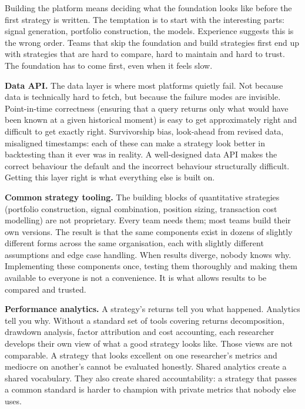 \documentclass[
  11pt,
]{article}
\begin{document}
Building the platform means deciding what the foundation looks like
before the first strategy is written. The temptation is to start with
the interesting parts: signal generation, portfolio construction, the
models. Experience suggests this is the wrong order. Teams that skip the
foundation and build strategies first end up with strategies that are
hard to compare, hard to maintain and hard to trust. The foundation has
to come first, even when it feels slow.

\textbf{Data API.} The data layer is where most platforms quietly fail.
Not because data is technically hard to fetch, but because the failure
modes are invisible. Point-in-time correctness (ensuring that a query
returns only what would have been known at a given historical moment)
is easy to get approximately right and difficult to get exactly right.
Survivorship bias, look-ahead from revised data, misaligned timestamps:
each of these can make a strategy look better in backtesting than it
ever was in reality. A well-designed data API makes the correct
behaviour the default and the incorrect behaviour structurally
difficult. Getting this layer right is what everything else is built on.

\textbf{Common strategy tooling.} The building blocks of quantitative
strategies (portfolio construction, signal combination, position
sizing, transaction cost modelling) are not proprietary. Every team
needs them; most teams build their own versions. The result is that the
same components exist in dozens of slightly different forms across the
same organisation, each with slightly different assumptions and edge
case handling. When results diverge, nobody knows why. Implementing
these components once, testing them thoroughly and making them available
to everyone is not a convenience. It is what allows results to be
compared and trusted.

\textbf{Performance analytics.} A strategy's returns tell you what
happened. Analytics tell you why. Without a standard set of tools
covering returns decomposition, drawdown analysis, factor attribution
and cost accounting, each researcher develops their own view of what a
good strategy looks like. Those views are not comparable. A strategy
that looks excellent on one researcher's metrics and mediocre on
another's cannot be evaluated honestly. Shared analytics create a shared
vocabulary. They also create shared accountability: a strategy that
passes a common standard is harder to champion with private metrics that
nobody else uses.
\end{document}
